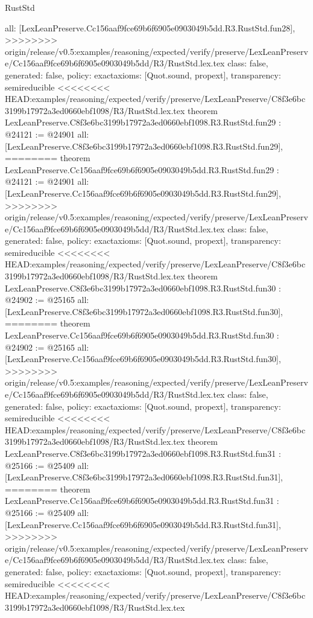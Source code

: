 \begin{lexlean}{RustStd}
\begin{coremodule}
{\begin{coremodule}
{{{{{{{{{{{{{{{{{{{{{{{{{{{{{{{{  all: [LexLeanPreserve.Cc156aaf9fce69b6f6905e0903049b5dd.R3.RustStd.fun28],
>>>>>>>> origin/release/v0.5:examples/reasoning/expected/verify/preserve/LexLeanPreserve/Cc156aaf9fce69b6f6905e0903049b5dd/R3/RustStd.lex.tex
  class: false,
  generated: false,
  policy: exact{axioms: [Quot.sound, propext]},
  transparency: semireducible
}
<<<<<<<< HEAD:examples/reasoning/expected/verify/preserve/LexLeanPreserve/C8f3e6bc3199b17972a3ed0660ebf1098/R3/RustStd.lex.tex
theorem LexLeanPreserve.C8f3e6bc3199b17972a3ed0660ebf1098.R3.RustStd.fun29 : @24121 := @24901 {
  all: [LexLeanPreserve.C8f3e6bc3199b17972a3ed0660ebf1098.R3.RustStd.fun29],
========
theorem LexLeanPreserve.Cc156aaf9fce69b6f6905e0903049b5dd.R3.RustStd.fun29 : @24121 := @24901 {
  all: [LexLeanPreserve.Cc156aaf9fce69b6f6905e0903049b5dd.R3.RustStd.fun29],
>>>>>>>> origin/release/v0.5:examples/reasoning/expected/verify/preserve/LexLeanPreserve/Cc156aaf9fce69b6f6905e0903049b5dd/R3/RustStd.lex.tex
  class: false,
  generated: false,
  policy: exact{axioms: [Quot.sound, propext]},
  transparency: semireducible
}
<<<<<<<< HEAD:examples/reasoning/expected/verify/preserve/LexLeanPreserve/C8f3e6bc3199b17972a3ed0660ebf1098/R3/RustStd.lex.tex
theorem LexLeanPreserve.C8f3e6bc3199b17972a3ed0660ebf1098.R3.RustStd.fun30 : @24902 := @25165 {
  all: [LexLeanPreserve.C8f3e6bc3199b17972a3ed0660ebf1098.R3.RustStd.fun30],
========
theorem LexLeanPreserve.Cc156aaf9fce69b6f6905e0903049b5dd.R3.RustStd.fun30 : @24902 := @25165 {
  all: [LexLeanPreserve.Cc156aaf9fce69b6f6905e0903049b5dd.R3.RustStd.fun30],
>>>>>>>> origin/release/v0.5:examples/reasoning/expected/verify/preserve/LexLeanPreserve/Cc156aaf9fce69b6f6905e0903049b5dd/R3/RustStd.lex.tex
  class: false,
  generated: false,
  policy: exact{axioms: [Quot.sound, propext]},
  transparency: semireducible
}
<<<<<<<< HEAD:examples/reasoning/expected/verify/preserve/LexLeanPreserve/C8f3e6bc3199b17972a3ed0660ebf1098/R3/RustStd.lex.tex
theorem LexLeanPreserve.C8f3e6bc3199b17972a3ed0660ebf1098.R3.RustStd.fun31 : @25166 := @25409 {
  all: [LexLeanPreserve.C8f3e6bc3199b17972a3ed0660ebf1098.R3.RustStd.fun31],
========
theorem LexLeanPreserve.Cc156aaf9fce69b6f6905e0903049b5dd.R3.RustStd.fun31 : @25166 := @25409 {
  all: [LexLeanPreserve.Cc156aaf9fce69b6f6905e0903049b5dd.R3.RustStd.fun31],
>>>>>>>> origin/release/v0.5:examples/reasoning/expected/verify/preserve/LexLeanPreserve/Cc156aaf9fce69b6f6905e0903049b5dd/R3/RustStd.lex.tex
  class: false,
  generated: false,
  policy: exact{axioms: [Quot.sound, propext]},
  transparency: semireducible
}
<<<<<<<< HEAD:examples/reasoning/expected/verify/preserve/LexLeanPreserve/C8f3e6bc3199b17972a3ed0660ebf1098/R3/RustStd.lex.tex
}}}}}}}}}}}}}}}}}}}}}}}}}}}}}}}}}}
\end{coremodule}}
\end{coremodule}
\end{lexlean}
